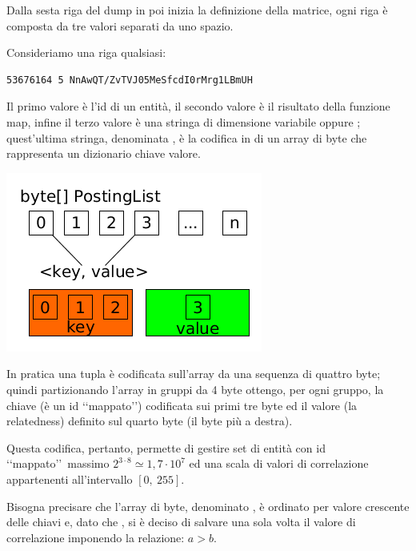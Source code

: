 Dalla sesta riga del dump in poi inizia la definizione della matrice, ogni riga è composta da tre valori separati da uno spazio. 

Consideriamo una riga qualsiasi:
\begin{lstlisting}[style=TeXStyle, caption=Riga del dump]
53676164 5 NnAwQT/ZvTVJ05MeSfcdI0rMrg1LBmUH
\end{lstlisting}

Il primo valore  è l'id di un entità, il secondo valore  è il risultato della funzione map, 
infine il terzo valore  è una stringa di dimensione variabile oppure ;
quest'ultima stringa, denominata , è la codifica in  di un array di byte che rappresenta un dizionario chiave valore. 

\begin{center}
    \includegraphics[scale=0.55]{Sources/Img/c02_01.png}
\end{center}

In pratica una tupla  è codificata sull'array da una sequenza di quattro byte; quindi partizionando l'array in gruppi da 4 byte 
ottengo, per ogni gruppo, la chiave (è un id \lq\lq mappato\rq\rq ) codificata sui primi tre byte ed il valore (la relatedness) definito sul quarto byte (il byte più a destra).

Questa codifica, pertanto, permette di gestire set di entità con id \lq\lq mappato\rq\rq\ massimo $2^{3 \cdot 8} \simeq 1,7 \cdot 10^7$ ed una scala di valori 
di correlazione appartenenti all'intervallo $[0,\ 255]$.

Bisogna precisare che l'array di byte, denominato , è ordinato per valore crescente delle chiavi e, dato che ,
si è deciso di salvare una sola volta il valore di correlazione imponendo la relazione: $a > b$. 

